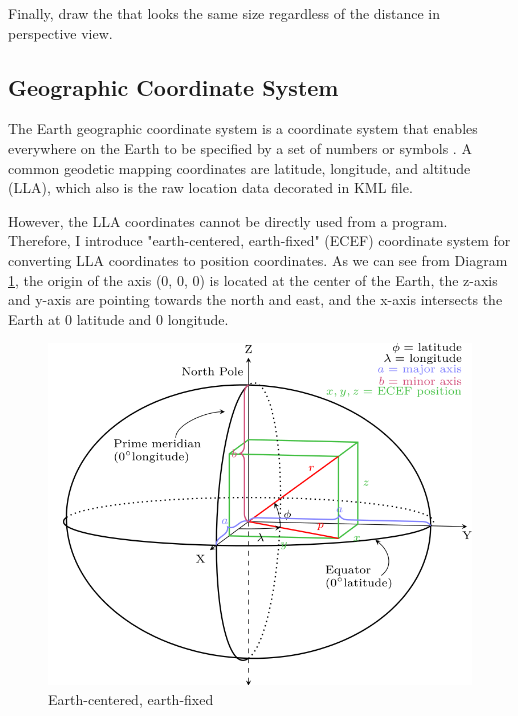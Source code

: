 Finally, draw the  that looks the same size regardless of the distance in perspective view.

\subsection{Geographic Coordinate System}

The Earth geographic coordinate system is a coordinate system that enables everywhere on the Earth to be specified by a set of numbers or symbols \cite{wiki.geographic-coordinate-system.2016}. A common geodetic mapping coordinates are latitude, longitude, and altitude (LLA), which also is the raw location data decorated in KML file.

However, the LLA coordinates cannot be directly used from a program. Therefore, I introduce "earth-centered, earth-fixed" (ECEF) coordinate system for converting LLA coordinates to position coordinates. As we can see from Diagram \ref{fig:ecef}, the origin of the axis (0, 0, 0) is located at the center of the Earth, the z-axis and y-axis are pointing towards the north and east, and the x-axis intersects the Earth at $0$ latitude and $0$ longitude.

\begin{figure}[H]
\caption[ECEF]{Earth-centered, earth-fixed \cite{wiki.ecef.2016}}
\label{fig:ecef}
\centering
\includegraphics[width=\textwidth, keepaspectratio]{Figures/ecef.png}
\decoRule
\end{figure}

